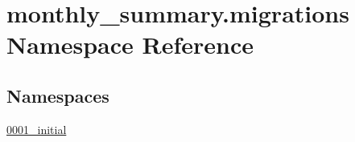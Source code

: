 \hypertarget{namespacemonthly__summary_1_1migrations}{\section{monthly\-\_\-summary.\-migrations Namespace Reference}
\label{namespacemonthly__summary_1_1migrations}
}
\subsection*{Namespaces}
\begin{DoxyCompactItemize}
\item 
\hyperlink{namespacemonthly__summary_1_1migrations_1_10001__initial}{0001\-\_\-initial}
\end{DoxyCompactItemize}
